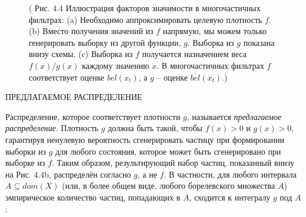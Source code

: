 \documentclass[10pt,a4paper]{article}
\begin{document}
\begin{figure}[H]
	\caption{ (  Рис. 4.4 Иллюстрация факторов значимости в многочастичных фильтрах: (a) Необходимо аппроксимировать целевую плотность $f$. (b) Вместо получения значений из $f$ напрямую, мы можем только генерировать выборку из другой функции, $g$. Выборка из $g$ показана внизу схемы. (c) Выборка из $f$ получается назначением веса
	$f(x)/g(x)$ каждому значению $x$. В многочастичных фильтрах $f$ соответствует оценке $bel(x_t)$, а $g$ – оценке $\overline{bel}(x_t)$.)}
	\label{fig:44orig}
\end{figure}

ПРЕДЛАГАЕМОЕ РАСПРЕДЕЛЕНИЕ

Распределение, которое соответствует плотности $g$, называется \textit{предлагаемое распределение}. Плотность $g$ должна быть такой, чтобы $f(x) > 0$ и $g(x) > 0$, гарантируя ненулевую вероятность сгенерировать частицу при формировании выборки из $g$ для любого состояния, которое может быть сгенерировано при выборке из $f$. Таким образом,
результирующий набор частиц, показанный внизу на Рис. 4.4b, распределён согласно $g$, а не $f$. В частности, для любого интервала $A\subseteq dom(X)$ (или, в более общем виде, любого борелевского множества $A$) эмпирическое количество частиц, попадающих в $A$, сходится к интегралу $g$ под $A$:\\
\end{document}
